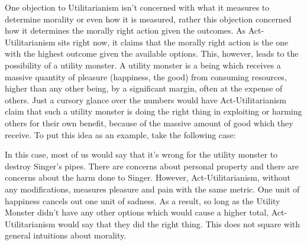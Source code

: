 One objection to Utilitarianism isn't concerned with what it measures to determine morality or even how it is measured, rather this objection concerned how it determines the morally right action given the outcomes. As Act-Utilitarianism sits right now, it claims that the morally right action is the one with the highest outcome given the available options. This, however, leads to the possibility of a utility monster. A utility monster is a being which receives a massive quantity of pleasure (happiness, the good) from consuming resources, higher than any other being, by a significant margin, often at the expense of others. Just a cursory glance over the numbers would have Act-Utilitarianism claim that such a utility monster is doing the right thing in exploiting or harming others for their own benefit, because of the massive amount of good which they receive. To put this idea as an example, take the following case:


In this case, most of us would say that it's wrong for the utility monster to destroy Singer's pipes. There are concerns about personal property and there are concerns about the harm done to Singer. However, Act-Utilitarianism, without any modifications, measures pleasure and pain with the same metric. One unit of happiness cancels out one unit of sadness. As a result, so long as the Utility Monster didn't have any other options which would cause a higher total, Act-Utilitarianism would say that they did the right thing. This does not square with general intuitions about morality. 

